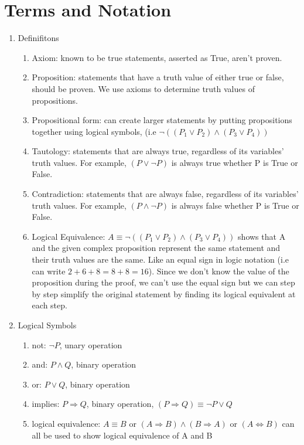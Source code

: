 \documentclass[11pt]{article}
\begin{document}
\section*{Terms and Notation}
\begin{enumerate}

\item
Definifitons
\begin{enumerate}
\item 
Axiom: known to be true statements, asserted as True, aren't proven.
\item 
Proposition: statements that have a truth value of either true or false, should be proven. We use axioms to determine truth values of propositions.
\item 
Propositional form: can create larger statements by putting propositions together using logical symbols, (i.e  $\neg (({P_1} \vee {P_2}) \wedge ({P_3} \vee {P_4}))$
\item
Tautology: statements that are always true, regardless of its variables' truth values. For example, $(P \vee {\neg P})$ is always true whether P is True or False.
\item
Contradiction: statements that are always false, regardless of its variables' truth values. For example, $(P \wedge {\neg P})$ is always false whether P is True or False.
\item
Logical Equivalence: $A \equiv \neg (({P_1} \vee {P_2}) \wedge ({P_3} \vee {P_4}))$ shows that A and the given complex proposition represent the same statement and their truth values are the same. Like an equal sign in logic notation (i.e can write $2 + 6 + 8 = 8 + 8 = 16$). Since we don't know the value of the proposition during the proof, we can't use the equal sign but we can step by step simplify the original statement by finding its logical equivalent at each step.
\end{enumerate}

\item
Logical Symbols
\begin{enumerate}
\item not: $\neg P$, unary operation
\item and: $P \wedge Q$, binary operation
\item or: $P \vee Q$, binary operation
\item implies: $P \Rightarrow Q$, binary operation, $(P \Rightarrow Q) \equiv {\neg P} \vee Q$
\item logical equivalence: $A \equiv B$ or $(A \Rightarrow B) \wedge (B \Rightarrow A)$ or $(A \Leftrightarrow B) $ can all be used to show logical equivalence of A and B
\end{enumerate}
\end{enumerate}
\end{document}
